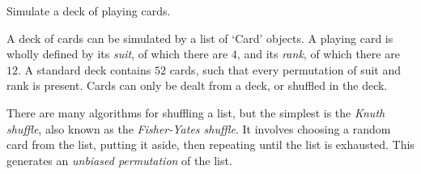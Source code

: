 

\problem Simulate a deck of playing cards.

\solution A deck of cards can be simulated by a list of `Card' objects. A playing card 
is wholly defined by its \textit{suit}, of which there are $4$, and its \textit{rank}, of which there are $12$.
A standard deck contains $52$ cards, such that every permutation of suit and rank is present. Cards can only
be dealt from a deck, or shuffled in the deck.

There are many algorithms for shuffling a list, but the simplest is the \textit{Knuth shuffle}, also known as the
\textit{Fisher-Yates shuffle}. It involves choosing a random card from the list, putting it aside, then repeating
until the list is exhausted. This generates an \textit{unbiased permutation} of the list.

